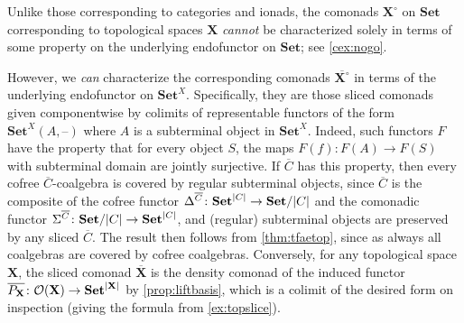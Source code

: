 \documentclass[11pt, oneside, article]{memoir}
\theoremstyle{plain}
\theoremstyle{definition}
\theoremstyle{remark}
\newenvironment{remark}
{\renewcommand\qedsymbol{$\lrcorner$}%
  \pushQED{\qed}\myremark}
{\popQED\endmyremark}
\DeclarePairedDelimiter{\abs}{\lvert}{\rvert}
\newcommand{\dash}{{\mathord{\text{--}}}}
\newcommand{\namedcat}[1]{\mathbf{#1}}
\newcommand{\spa}[1]{\mathbf{#1}}
\newcommand{\ion}[1]{\spa{#1}}
\newcommand{\Set}{\namedcat{Set}}
\newcommand{\clift}[1]{\overline{#1}}
\newcommand{\pts}[1]{{\abs{#1}}}
\newcommand{\ptlift}[1]{\overline{#1}}
\newcommand{\carr}{\Sigma}
\newcommand{\rcarr}{\Delta}
\newcommand{\car}[1]{\carr^{#1}}
\newcommand{\rcar}[1]{\rcarr^{#1}}
\newcommand{\ph}[1]{#1}
\newcommand{\topbasis}[1]{\pP_{#1}}
\newcommand{\Ho}[1]{#1}
\newcommand{\cmnd}[1]{{#1}}
\newcommand{\xA}{A}
\newcommand{\xS}{S}
\newcommand{\cC}{\cmnd{C}}
\newcommand{\pP}{\ph{P}}
\newcommand{\tX}{\spa{X}}
\newcommand{\iX}{\ion{X}}
\newcommand{\cX}{\toptocmd{\tX}}
\newcommand{\SetC}{\Set/\pts{\cC}}
\newcommand{\SetpC}{\Set^\pts{\cC}}
\newcommand{\SetpX}{\Set^\pts{\iX}}
\newcommand{\toptocmd}[1]{{{#1}^\circ}}
\newcommand{\opens}[1]{\mathcal{O}(#1)}
\begin{document}
\begin{remark}\label{rem:yesgo}
  Unlike those corresponding to categories and ionads, the comonads
  $\cX$ on $\Set$ corresponding to topological spaces $\tX$
  \emph{cannot} be characterized solely in terms of some property on
  the underlying endofunctor on $\Set$; see \cref{cex:nogo}.

  However, we \emph{can} characterize the corresponding comonads
  $\clift{\cX}$ in terms of the underlying endofunctor on
  $\Set^X$. Specifically, they are those sliced comonads given
  componentwise by colimits of representable functors of the form
  $\Ho{\Set^X}(\xA, \dash)$ where $\xA$ is a subterminal object in
  $\Set^X$. Indeed, such functors $F$ have the property that for every
  object $\xS$, the maps $F(f) \colon F(\xA) \to F(\xS)$ with
  subterminal domain are jointly surjective. If $\clift{\cC}$ has this
  property, then every cofree $\clift{\cC}$-coalgebra is covered by
  regular subterminal objects, since $\clift{\cC}$ is the composite of
  the cofree functor $\rcar{\clift{\cC}} \colon \SetpC \to \SetC$ and
  the comonadic functor $\car{\clift{\cC}} \colon \SetC \to \SetpC$,
  and (regular) subterminal objects are preserved by any sliced
  $\clift{\cC}$. The result then follows from \cref{thm:tfaetop},
  since as always all coalgebras are covered by cofree coalgebras.
  Conversely, for any topological space $\tX$, the sliced comonad
  $\clift{\tX}$ is the density comonad of the induced functor
  $\ptlift{\topbasis{\tX}} \colon \opens{\tX} \to \SetpX$ by
  \cref{prop:liftbasis}, which is a colimit of the desired form on
  inspection (giving the formula from \cref{ex:topslice}).
\end{remark}
\end{document}

